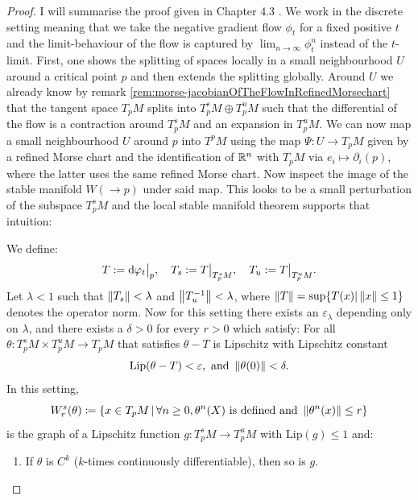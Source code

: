 \begin{proof}
	I will summarise the proof given in Chapter 4.3 \cite{banyaga2004lectures}.  We work in the discrete setting meaning that we take the negative gradient flow $\phi_t$ for a fixed positive $t$ and the limit-behaviour of the flow is captured by $\lim_{n\to \infty}\phi_t^n$ instead of the $t$-limit. First, one shows the splitting of spaces locally in a small neighbourhood $U$ around a critical point $p$ and then extends the splitting globally. Around $U$ we already know by remark \ref{rem:morse-jacobianOfTheFlowInRefinedMorsechart} that the tangent space $T_pM$ splits into $T^s_pM\oplus T^u_pM$ such that the differential of the flow is a contraction around $T^s_pM$ and an expansion in $T^u_pM$. We can now map a small neighbourhood $U$ around $p$ into $T^pM$ using the map $\Psi:U\to T_pM$ given by a refined Morse chart and the identification of $\mathbb{R}^n$ with $T_pM$ via $e_i\mapsto \partial_i(p)$, where the latter uses the same refined Morse chart. Now inspect the image of the stable manifold $W(\to p)$ under said map. This looks to be a small perturbation of the subspace $T^s_pM$ and the local stable manifold theorem supports that intuition: 
	\begin{lemma} \label{lem:morse-localUnStableManifoldTheorem}
	We define:
	\begin{align*}
		T:=\mathop{}\!\mathrm{d} \varphi_t\big|_p,\quad T_s:=T\big|_{T_p^sM},\quad T_u:=T\big|_{T_p^uM}.
	\end{align*} Let $\lambda<1$ such that $\left\lVert T_s\right\rVert<\lambda$ and $\left\lVert T_u^{-1}\right\rVert<\lambda$, where $\left\lVert T\right\rVert= \sup\{T(x)|\left\lVert x\right\rVert\leq 1\}$ denotes the operator norm. Now for this setting there exists an $\varepsilon_{\lambda}$ depending only on $\lambda$, and there exists a $\delta>0$ for every $r>0$ which satisfy: For all $\theta:T_p^sM \times T_p^uM \to T_pM$ that satisfies $\theta-T$ is Lipschitz with Lipschitz constant
	\begin{equation*}
		\mathrm{Lip}(\theta-T)<\varepsilon , \text{ and }\left\lVert\theta(0)\right\rVert<\delta.
	\end{equation*}In this setting, 
	\begin{equation*}
	W^s_r(\theta)\coloneq \{x\in T_pM\,|\, \forall n\geq 0, \theta^n(X) \text{ is defined and } \left\lVert\theta^n(x)\right\rVert\leq r\}
	\end{equation*} is the graph of a Lipschitz function $g:T^s_pM\to T^u_pM$ with $ \text{Lip}(g)\leq 1$ and:
	\begin{enumerate}
		\item If $\theta$ is $C^k$ ($k$-times continuously differentiable), then so is $g$.

\end{enumerate}
\end{lemma}
\end{proof}
